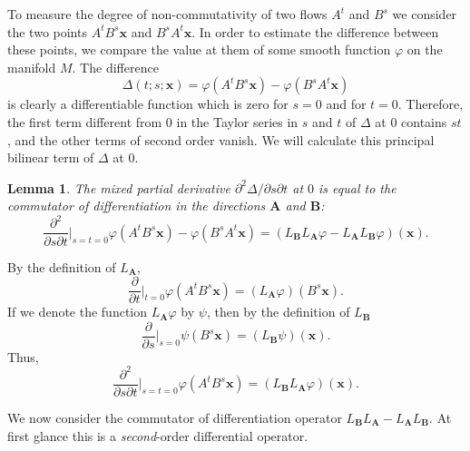 \documentclass[leqno]{book}
\numberwithin{equation}{section}
\theoremstyle{plain}
\newtheorem{lem}[thm]{Lemma} %
\let\oldendproof\endproof
\renewenvironment{proof}[1][\proofname]{%
  \oldproof[\textsc{#1}]%
}{\oldendproof}
\theoremstyle{definition}
\theoremstyle{remark}
\theoremstyle{smallcap}
\numberwithin{prob}{section}
\begin{document}
To measure the degree of non-commutativity
of two flows $A^t$ and $B^s$ we consider the two points
$A^tB^s\mathbf x$ and $B^sA^t\mathbf x$.
%
In order to estimate the difference between these points,
we compare the value at them of some smooth function
$\varphi$ on the manifold $M$. The difference
$$
\Delta(t; s; \mathbf x)
=
\varphi(A^tB^s\mathbf x)
-
\varphi(B^sA^t\mathbf x)
$$
is clearly a differentiable function which is zero for $s = 0$
and for $t = 0$.
Therefore, the first term different from $0$ in the Taylor series
in $s$ and $t$ of $\Delta$ at $0$ contains $st$,
and the other terms of second order vanish.
%
We will calculate this principal bilinear term of $\Delta$ at $0$.


\begin{lem}
  The mixed partial derivative $\partial^2 \Delta/\partial s \partial t$ at $0$
  is equal to the commutator of differentiation in the directions
  $\mathbf A$ and $\mathbf B$:
  $$
  \frac{\partial^2}{\partial s \partial t}\bigg|_{s=t=0}
  {\varphi(A^tB^s\mathbf x) - \varphi(B^sA^t\mathbf x)}
  =
  (L_\mathbf{B} L_\mathbf{A} \varphi
  -L_\mathbf{A} L_\mathbf{B} \varphi)
  (\mathbf x).
  $$
\end{lem}

\begin{proof}
  By the definition of $L_\mathbf{A}$,
  $$
  \frac{\partial}{\partial t}\bigg|_{t=0}
  \varphi(A^tB^s\mathbf x)
  =
  (L_\mathbf{A} \varphi)(B^s\mathbf x).
  $$
  If we denote the function $L_\mathbf{A}\varphi$ by $\psi$,
  then by the definition of $L_\mathbf{B}$
  $$
  \frac{\partial}{\partial s}\bigg|_{s=0}
  \psi(B^s\mathbf x)
  =
  (L_\mathbf{B} \psi)(\mathbf x).
  $$
  Thus,
  $$
  \frac{\partial^2}{\partial s \partial t}\bigg|_{s=t=0}
  \varphi(A^tB^s\mathbf x)
  =
  (L_\mathbf{B} L_\mathbf{A} \varphi)(\mathbf x).
  $$
\end{proof}

We now consider the commutator of differentiation operator
$L_\mathbf{B} L_\mathbf{A} - L_\mathbf{A} L_\mathbf{B}$.
%
At first glance this is a \emph{second}-order differential operator.
\end{document}
